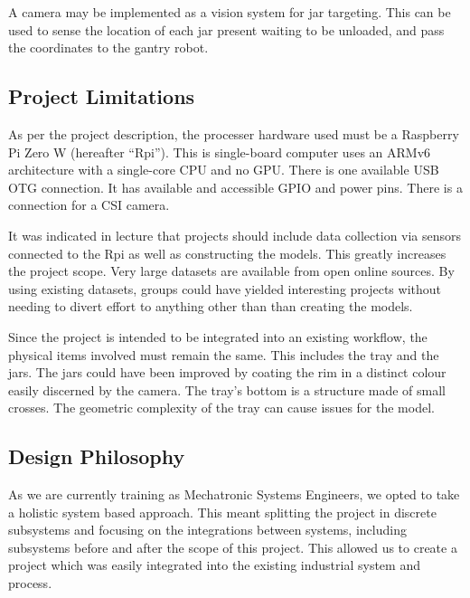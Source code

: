 \documentclass[11pt]{article}
\begin{document}
            A camera may be implemented as a vision system for jar targeting. This can be used to sense the location of each jar present waiting to be unloaded, and pass the coordinates to the gantry robot.

        \subsection{Project Limitations}\label{sec:proj-limits}
            As per the project description, the processer hardware used must be a Raspberry Pi Zero W (hereafter ``Rpi''). This is single-board computer uses an ARMv6 architecture with a single-core CPU and no GPU. There is one available USB OTG connection. It has available and accessible GPIO and power pins. There is a connection for a CSI camera\cite{rpi}. 

            It was indicated in lecture that projects should include data collection via sensors connected to the Rpi as well as constructing the models. This greatly increases the project scope. Very large datasets are available  from open online sources. By using existing datasets, groups could have yielded interesting projects without needing to divert effort to anything other than than creating the models.

            Since the project is intended to be integrated into an existing workflow, the physical items involved must remain the same. This includes the tray and the jars. The jars could have been improved by coating the rim in a distinct colour easily discerned by the camera. The tray's bottom is a structure made of small crosses. The geometric complexity of the tray can cause issues for the model. 
            

        \subsection{Design Philosophy}
            As we are currently training as Mechatronic Systems Engineers, we opted to take a holistic system based approach. This meant splitting the project in discrete subsystems and focusing on the integrations between systems, including subsystems before and after the scope of this project. This allowed us to create a project which was easily integrated into the existing industrial system and process. 
\end{document}
